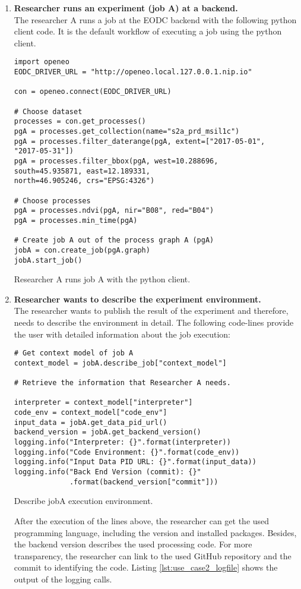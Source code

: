 \documentclass[draft,final]{vutinfth} %
\newenvironment{code}{\captionsetup{type=listing}}{}
\begin{document}
\begin{enumerate}
	\item \textbf{Researcher runs an experiment (job A) at a backend.}\\
	The researcher A runs a job at the EODC backend with the following python client code. It is the default workflow of executing a job using the python client. 

\begin{code}
	\begin{verbatim}
import openeo
EODC_DRIVER_URL = "http://openeo.local.127.0.0.1.nip.io"

con = openeo.connect(EODC_DRIVER_URL)

# Choose dataset
processes = con.get_processes()
pgA = processes.get_collection(name="s2a_prd_msil1c")
pgA = processes.filter_daterange(pgA, extent=["2017-05-01", 
"2017-05-31"])
pgA = processes.filter_bbox(pgA, west=10.288696, 
south=45.935871, east=12.189331, 
north=46.905246, crs="EPSG:4326")

# Choose processes
pgA = processes.ndvi(pgA, nir="B08", red="B04")
pgA = processes.min_time(pgA)

# Create job A out of the process graph A (pgA)
jobA = con.create_job(pgA.graph)
jobA.start_job()
	\end{verbatim}
	\caption{Researcher A runs job A with the python client.}
	\label{lst:impl_usecase2_1}
\end{code}
	\item \textbf{Researcher wants to describe the experiment environment.}\\
	The researcher wants to publish the result of the experiment and therefore, needs to describe the environment in detail. The following code-lines provide the user with detailed information about the job execution:

\begin{code}
	\begin{verbatim}
# Get context model of job A
context_model = jobA.describe_job["context_model"]

# Retrieve the information that Researcher A needs.

interpreter = context_model["interpreter"]
code_env = context_model["code_env"]
input_data = jobA.get_data_pid_url()
backend_version = jobA.get_backend_version()
logging.info("Interpreter: {}".format(interpreter))
logging.info("Code Environment: {}".format(code_env))
logging.info("Input Data PID URL: {}".format(input_data))
logging.info("Back End Version (commit): {}"
             .format(backend_version["commit"]))
	\end{verbatim}
	\caption{Describe jobA execution environment.}
	\label{lst:impl_usecase2_2}
\end{code}
	After the execution of the lines above, the researcher can get the used programming language, including the version and installed packages. Besides, the backend version describes the used processing code. For more transparency, the researcher can link to the used GitHub repository and the commit to identifying the code. Listing \ref{lst:use_case2_logfile} shows the output of the logging calls.  
	
\end{enumerate}
\end{document}
